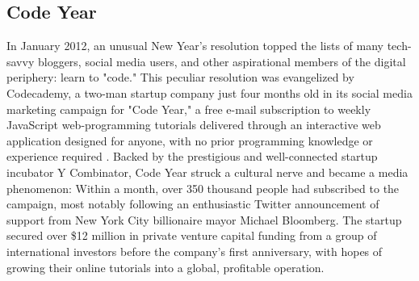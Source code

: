 \subsection*{Code Year}
In January 2012, an unusual New Year's resolution topped the lists of many tech-savvy bloggers, social media users, and other aspirational members of the digital periphery: learn to "code." This peculiar resolution was evangelized by Codecademy, a two-man startup company just four months old in its social media marketing campaign for "Code Year," a free e-mail subscription to weekly JavaScript web-programming tutorials delivered through an interactive web application designed for anyone, with no prior programming knowledge or experience required \autocite{Wortham12}. Backed by the prestigious and well-connected startup incubator Y Combinator, Code Year struck a cultural nerve and became a media phenomenon: Within a month, over 350 thousand people had subscribed to the campaign, most notably following an enthusiastic Twitter announcement of support from New York City billionaire mayor Michael Bloomberg. The startup secured over \$12 million in private venture capital funding from a group of international investors before the company's first anniversary, with hopes of growing their online tutorials into a global, profitable operation.

